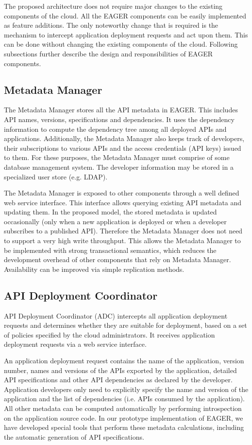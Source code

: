The proposed architecture does not require major changes to the existing components of the cloud. All the 
EAGER components can be easily implemented as feature additions. 
The only noteworthy change that is required is the mechanism to intercept application deployment requests and act upon them. 
This can be done without changing the existing components of the cloud.
Following subsections further describe the design and responsibilities of EAGER components.

\subsection{Metadata Manager}
The Metadata Manager stores all the API metadata in EAGER. This includes API names, versions, specifications and dependencies.
It uses the dependency information to compute the dependency tree among all deployed APIs and applications. Additionally, the Metadata Manager
also keeps track of developers, their subscriptions to various APIs and the access credentials (API keys) issued to them. For these purposes,
the Metadata Manager must comprise of some database management system. The developer information may be stored in a specialized user
store (e.g. LDAP).

The Metadata Manager is exposed to other components through a well defined web service interface.
This interface allows querying existing API metadata and updating them. In the proposed model, the stored metadata is updated 
occasionally (only when a new application is deployed or when a developer subscribes to a published API). Therefore the Metadata Manager
does not need to support a very high write throughput. This allows the Metadata Manager to be implemented with strong transactional semantics,
which reduces the development overhead of other components that rely on Metadata Manager. Availability can be improved via
simple replication methods.

\subsection{API Deployment Coordinator}
API Deployment Coordinator (ADC) intercepts all application deployment requests and determines whether they are suitable for deployment, based
on a set of policies specified by the cloud administrators. It receives application deployment requests via a web service interface.

An application deployment request contains the name of the application, version number, names and versions of the APIs
exported by the application, detailed API specifications and other API dependencies as declared by the developer. Application developers only
need to explicitly specify the name and version of the application and the list of dependencies (i.e. APIs consumed
by the application). All other metadata can be computed automatically by performing introspection on the
application source code. In our prototype implementation of EAGER, we have developed special tools that perform these metadata calculations, 
including the automatic generation of API specifications.


